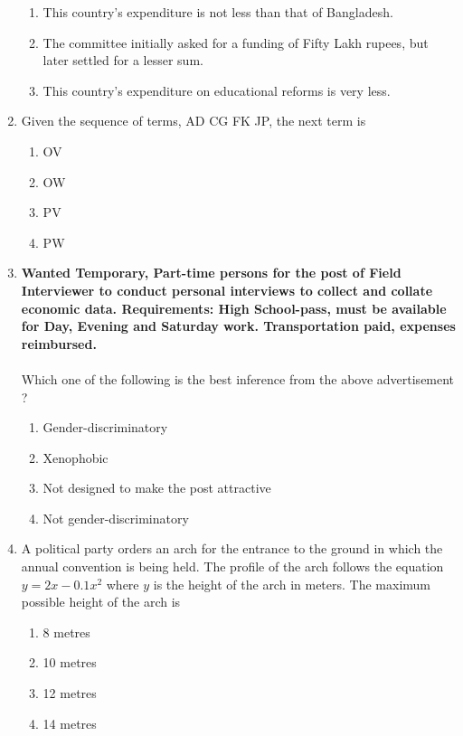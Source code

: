 \documentclass[journal]{IEEEtran}
\begin{document}
\begin{enumerate}
\begin{enumerate}
    \item This country's expenditure is not less than that of Bangladesh.
    \item The committee initially asked for a funding of Fifty Lakh rupees, but later settled for a lesser sum.
    \item This country's expenditure on educational reforms is very less.\\
 \end{enumerate}
\item Given the sequence of terms, AD CG FK JP, the next term is
\begin{enumerate}
     \item OV
     \item OW
     \item PV
     \item PW \\
 \end{enumerate}
\item \textbf{Wanted Temporary, Part-time persons for the post of Field Interviewer to conduct personal interviews to collect and collate economic data. Requirements: High School-pass, must be available for Day, Evening and Saturday work. Transportation paid, expenses reimbursed.}\\\\
Which one of the following is the best inference from the above advertisement ? 
\begin{enumerate}
    \item Gender-discriminatory 
    \item Xenophobic
    \item Not designed to make the post attractive
    \item Not gender-discriminatory  \\
\end{enumerate}
\item A political party orders an arch for the entrance to the ground in which the annual convention is being held. The profile of the arch follows the equation $y = 2x - 0.1x^2$ where $y$ is the height of the arch in meters. The maximum possible height of the arch is 
\begin{enumerate}
    \item 8 metres
    \item 10 metres
    \item 12 metres
    \item 14 metres \\
\end{enumerate}

\end{enumerate}
\end{document}
